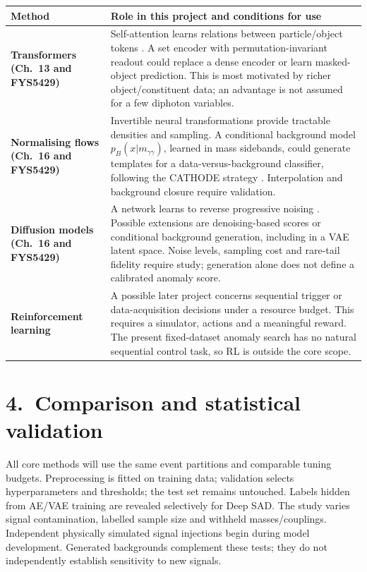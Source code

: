 \documentclass[11pt,a4paper]{article}
\begin{document}
{\small
\renewcommand{\arraystretch}{1.13}
\begin{tabularx}{\linewidth}{@{}>{\raggedright\arraybackslash\bfseries}p{30mm}X@{}}
\toprule
Method & \textbf{Role in this project and conditions for use}\\
\midrule
Transformers (Ch.~13 and FYS5429) &
Self-attention learns relations between particle/object tokens \cite{transformer}. A set encoder with permutation-invariant readout could replace a dense encoder or learn masked-object prediction. This is most motivated by richer object/constituent data; an advantage is not assumed for a few diphoton variables.\\
Normalising flows (Ch.~16 and FYS5429) &
Invertible neural transformations provide tractable densities and sampling. A conditional background model $p_B(x|m_{\gamma\gamma})$, learned in mass sidebands, could generate templates for a data-versus-background classifier, following the CATHODE strategy \cite{flow}. Interpolation and background closure require validation.\\
Diffusion models (Ch.~16 and FYS5429) &
A network learns to reverse progressive noising \cite{diffusion}. Possible extensions are denoising-based scores or conditional background generation, including in a VAE latent space. Noise levels, sampling cost and rare-tail fidelity require study; generation alone does not define a calibrated anomaly score.\\
Reinforcement learning &
A possible later project concerns sequential trigger or data-acquisition decisions under a resource budget. This requires a simulator, actions and a meaningful reward. The present fixed-dataset anomaly search has no natural sequential control task, so RL is outside the core scope.\\
\bottomrule
\end{tabularx}
}

\section{4.\ Comparison and statistical validation}

All core methods will use the same event partitions and comparable
tuning budgets. Preprocessing is fitted on training data; validation
selects hyperparameters and thresholds; the test set remains
untouched. Labels hidden from AE/VAE training are revealed selectively
for Deep SAD. The study varies signal contamination, labelled sample
size and withheld masses/couplings. Independent physically simulated
signal injections begin during model development. Generated
backgrounds complement these tests; they do not independently
establish sensitivity to new signals.
\end{document}

